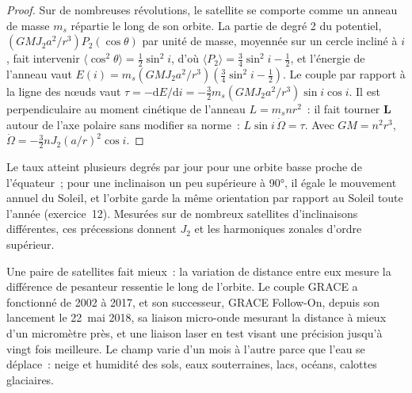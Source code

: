 \begin{proof}
Sur de nombreuses révolutions, le satellite se comporte comme un anneau de masse $m_s$ répartie le long
de son orbite. La partie de degré 2 du potentiel,
$(GMJ_2a^2/r^3)P_2(\cos\theta)$ par unité de masse, moyennée sur un cercle incliné
à $i$, fait intervenir $\langle\cos^2\theta\rangle = \tfrac12\sin^2i$, d'où
$\langle P_2\rangle = \tfrac34\sin^2i - \tfrac12$, et l'énergie de l'anneau vaut
$E(i) = m_s(GMJ_2a^2/r^3)(\tfrac34\sin^2i - \tfrac12)$. Le couple par rapport à la ligne
des nœuds vaut $\tau = -\mathrm dE/\mathrm di = -\tfrac32m_s(GMJ_2a^2/r^3)\sin
i\cos i$. Il est perpendiculaire au moment cinétique de l'anneau $L = m_snr^2$~: il
fait tourner $\mathbf L$ autour de l'axe polaire sans modifier sa norme~:
$L\sin i\,\dot\Omega = \tau$. Avec $GM = n^2r^3$, $\dot\Omega =
-\tfrac32nJ_2(a/r)^2\cos i$.
\end{proof}

Le taux atteint plusieurs degrés par jour pour une orbite basse proche de l'équateur~; pour une
inclinaison un peu supérieure à \ang{90}, il égale le mouvement annuel du Soleil, et l'orbite
garde la même orientation par rapport au Soleil toute l'année (exercice~12). Mesurées sur
de nombreux satellites d'inclinaisons différentes, ces précessions donnent $J_2$ et les
harmoniques zonales d'ordre supérieur.

Une paire de satellites fait mieux~: la variation de distance entre eux mesure la
différence de pesanteur ressentie le long de l'orbite. Le couple GRACE a fonctionné de 2002 à 2017, et son
successeur, GRACE Follow-On, depuis son lancement le \num{22}~mai 2018, sa liaison micro-onde
mesurant la distance à mieux d'un micromètre près, et une liaison laser en test visant une
précision jusqu'à vingt fois meilleure.
Le champ varie d'un mois à l'autre parce que l'eau se déplace~: neige et humidité
des sols, eaux souterraines, lacs, océans, calottes glaciaires.

